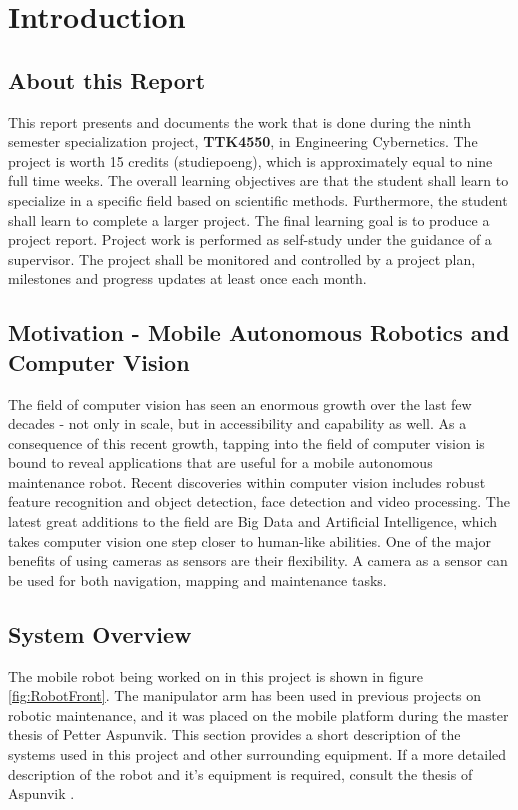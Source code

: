 \chapter{Introduction}
\label{chp:introduction} 

\section{About this Report}

This report presents and documents the work that is done during the ninth semester specialization project, \textbf{TTK4550}, in Engineering Cybernetics. The project is worth 15 credits (studiepoeng), which is approximately equal to nine full time weeks. The overall learning objectives are that the student shall learn to specialize in a specific field based on scientific methods. Furthermore, the student shall learn to complete a larger project. The final learning goal is to produce a project report. Project work is performed as self-study under the guidance of a supervisor. The project shall be monitored and controlled by a project plan, milestones and progress updates at least once each month.

\section{Motivation - Mobile Autonomous Robotics and Computer Vision}

The field of computer vision has seen an enormous growth over the last few decades - not only in scale, but in accessibility and capability as well. As a consequence of this recent growth, tapping into the field of computer vision is bound to reveal applications that are useful for a mobile autonomous maintenance robot. Recent discoveries within computer vision includes robust feature recognition and object detection, face detection and video processing. The latest great additions to the field are Big Data and Artificial Intelligence, which takes computer vision one step closer to human-like abilities. One of the major benefits of using cameras as sensors are their flexibility. A camera as a sensor can be used for both navigation, mapping and maintenance tasks. 

\section{System Overview}

The mobile robot being worked on in this project is shown in figure \ref{fig:RobotFront}. The manipulator arm  has been used in previous projects on robotic maintenance, and it was placed on the mobile platform during the master thesis of Petter Aspunvik. This section provides a short description of the systems used in this project and other surrounding equipment. If a more detailed description of the robot and it's equipment is required, consult the thesis of Aspunvik \cite{aspunvik}.

